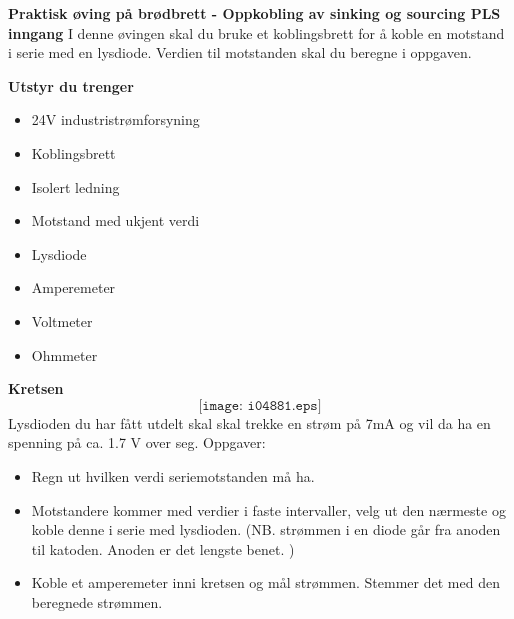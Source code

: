 

\large \textbf{Praktisk øving på brødbrett - Oppkobling av sinking og sourcing PLS inngang}
\normalsize 
\vskip 10pt 
I denne øvingen skal du bruke et koblingsbrett for å koble en motstand i serie med en lysdiode. Verdien til motstanden skal du beregne i oppgaven. 

\vskip 10pt 
\large \textbf{Utstyr du trenger}

\vskip 10pt 
\begin{itemize}[noitemsep]

\item 24V industristrømforsyning
\item Koblingsbrett
\item Isolert ledning
\item Motstand med ukjent verdi 
\item Lysdiode
\item Amperemeter
\item Voltmeter
\item Ohmmeter
\end{itemize}


\large \textbf{Kretsen}
\normalsize
\vskip 10pt 
$$\texttt{[image: i04881.eps]}$$
Lysdioden du har fått utdelt skal skal trekke en strøm på 7mA og vil da ha en spenning på ca. 1.7 V over seg. 
Oppgaver:
\begin{itemize}[noitemsep]
	\item Regn ut hvilken verdi seriemotstanden må ha. 
	\item Motstandere kommer med verdier i faste intervaller, velg ut den nærmeste og koble denne i serie med lysdioden. (NB. strømmen i en diode går fra anoden til katoden. Anoden er det lengste benet. )
	\item Koble et amperemeter inni kretsen og mål strømmen. Stemmer det med den beregnede strømmen. 
\end{itemize}




















